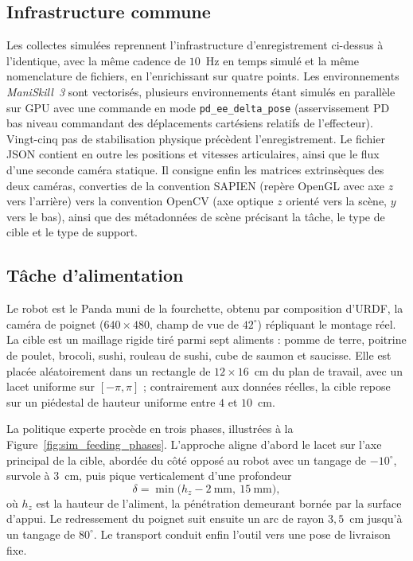 \subsection*{Infrastructure commune} Les collectes simulées reprennent l'infrastructure d'enregistrement ci-dessus à l'identique, avec la même cadence de $10$~Hz en temps simulé et la même nomenclature de fichiers, en l'enrichissant sur quatre points. Les environnements \textit{ManiSkill~3} sont vectorisés, plusieurs environnements étant simulés en parallèle sur \ac{GPU} avec une commande en mode \texttt{pd\_ee\_delta\_pose} (asservissement PD bas niveau commandant des déplacements cartésiens relatifs de l'effecteur). Vingt-cinq pas de stabilisation physique précèdent l'enregistrement. Le fichier \ac{JSON} contient en outre les positions et vitesses articulaires, ainsi que le flux d'une seconde caméra statique. Il consigne enfin les matrices extrinsèques des deux caméras, converties de la convention SAPIEN (repère OpenGL avec axe $z$ vers l'arrière) vers la convention OpenCV (axe optique $z$ orienté vers la scène, $y$ vers le bas), ainsi que des métadonnées de scène précisant la tâche, le type de cible et le type de support.

\subsection*{Tâche d'alimentation}

Le robot est le Panda muni de la fourchette, obtenu par composition d'\ac{URDF}, la caméra de poignet ($640\times480$, champ de vue de $42^{\circ}$) répliquant le montage réel. La cible est un maillage rigide tiré parmi sept aliments : pomme de terre, poitrine de poulet, brocoli, sushi, rouleau de sushi, cube de saumon et saucisse. Elle est placée aléatoirement dans un rectangle de $12\times16$~cm du plan de travail, avec un lacet uniforme sur $[-\pi,\pi]$ ; contrairement aux données réelles, la cible repose sur un piédestal de hauteur uniforme entre $4$ et $10$~cm.

La politique experte procède en trois phases, illustrées à la Figure~\ref{fig:sim_feeding_phases}. L'approche aligne d'abord le lacet sur l'axe principal de la cible, abordée du côté opposé au robot avec un tangage de $-10^{\circ}$, survole à $3$~cm, puis pique verticalement d'une profondeur
\begin{equation}
  \delta = \min\!\big(h_z - 2~\text{mm},\ 15~\text{mm}\big),
\end{equation}
où $h_z$ est la hauteur de l'aliment, la pénétration demeurant bornée par la surface d'appui. Le redressement du poignet suit ensuite un arc de rayon $3{,}5$~cm jusqu'à un tangage de $80^{\circ}$. Le transport conduit enfin l'outil vers une pose de livraison fixe.

